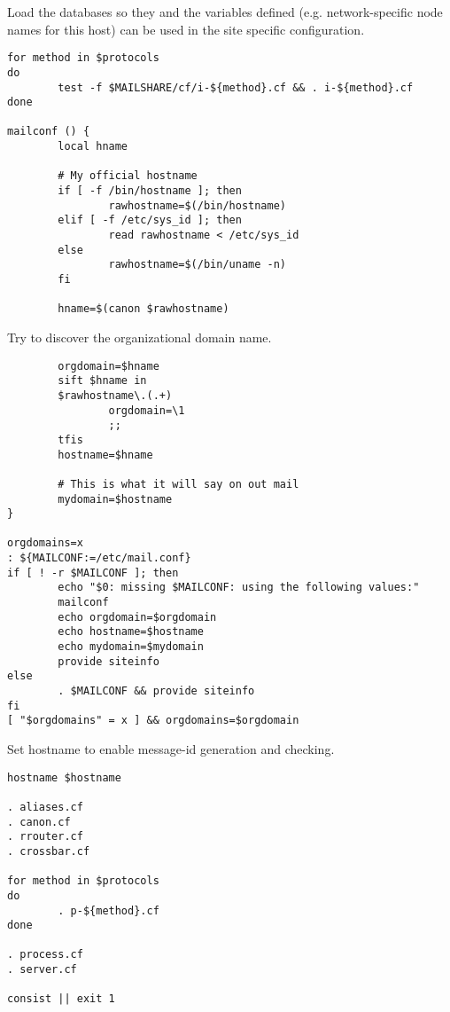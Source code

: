 Load the databases so they and the variables defined (e.g. network-specific
node names for this host) can be used in the site specific configuration.

\begin{tscreen}
\begin{verbatim}
for method in $protocols
do
        test -f $MAILSHARE/cf/i-${method}.cf && . i-${method}.cf
done

mailconf () {
        local hname

        # My official hostname
        if [ -f /bin/hostname ]; then
                rawhostname=$(/bin/hostname)
        elif [ -f /etc/sys_id ]; then
                read rawhostname < /etc/sys_id
        else
                rawhostname=$(/bin/uname -n)
        fi

        hname=$(canon $rawhostname)
\end{verbatim}
\end{tscreen}


Try to discover the organizational domain name.

\begin{tscreen}
\begin{verbatim}
        orgdomain=$hname
        sift $hname in
        $rawhostname\.(.+)
                orgdomain=\1
                ;;
        tfis
        hostname=$hname

        # This is what it will say on out mail
        mydomain=$hostname
}

orgdomains=x
: ${MAILCONF:=/etc/mail.conf}
if [ ! -r $MAILCONF ]; then
        echo "$0: missing $MAILCONF: using the following values:"
        mailconf
        echo orgdomain=$orgdomain
        echo hostname=$hostname
        echo mydomain=$mydomain
        provide siteinfo
else
        . $MAILCONF && provide siteinfo
fi
[ "$orgdomains" = x ] && orgdomains=$orgdomain
\end{verbatim}
\end{tscreen}


Set hostname to enable message-id generation and checking.

\begin{tscreen}
\begin{verbatim}
hostname $hostname

. aliases.cf
. canon.cf
. rrouter.cf
. crossbar.cf

for method in $protocols
do
        . p-${method}.cf
done

. process.cf
. server.cf

consist || exit 1
\end{verbatim}
\end{tscreen}





